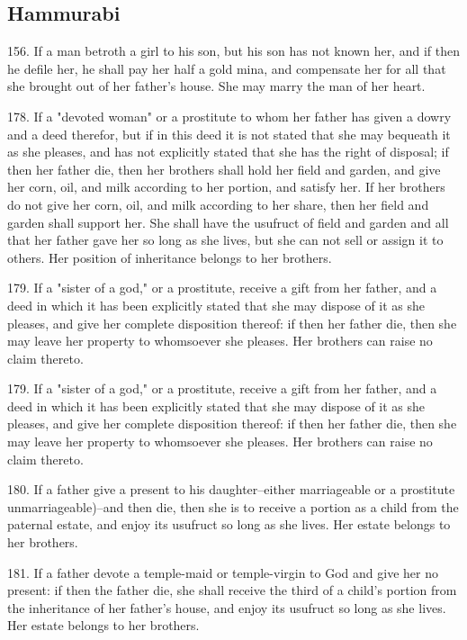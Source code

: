 \documentclass[11pt]{article}
\begin{document}
{\subsection{Hammurabi}











156. If a man betroth a girl to his son, but his son has not known her, and if then he defile her, he shall pay her half a gold mina, and compensate her for all that she brought out of her father's house. She may marry the man of her heart.


178. If a "devoted woman" or a prostitute to whom her father has given a dowry and a deed therefor, but if in this deed it is not stated that she may bequeath it as she pleases, and has not explicitly stated that she has the right of disposal; if then her father die, then her brothers shall hold her field and garden, and give her corn, oil, and milk according to her portion, and satisfy her. If her brothers do not give her corn, oil, and milk according to her share, then her field and garden shall support her. She shall have the usufruct of field and garden and all that her father gave her so long as she lives, but she can not sell or assign it to others. Her position of inheritance belongs to her brothers.

179. If a "sister of a god," or a prostitute, receive a gift from her father, and a deed in which it has been explicitly stated that she may dispose of it as she pleases, and give her complete disposition thereof: if then her father die, then she may leave her property to whomsoever she pleases. Her brothers can raise no claim thereto.

179. If a "sister of a god," or a prostitute, receive a gift from her father, and a deed in which it has been explicitly stated that she may dispose of it as she pleases, and give her complete disposition thereof: if then her father die, then she may leave her property to whomsoever she pleases. Her brothers can raise no claim thereto.


180. If a father give a present to his daughter--either marriageable or a prostitute unmarriageable)--and then die, then she is to receive a portion as a child from the paternal estate, and enjoy its usufruct so long as she lives. Her estate belongs to her brothers.


181. If a father devote a temple-maid or temple-virgin to God and give her no present: if then the father die, she shall receive the third of a child's portion from the inheritance of her father's house, and enjoy its usufruct so long as she lives. Her estate belongs to her brothers.

}
\end{document}
